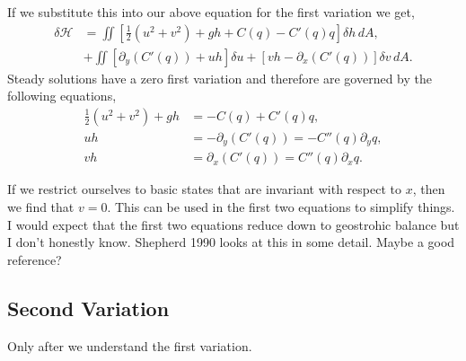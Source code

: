 \documentclass[12pt]{article}
\begin{document}
    If we substitute this into our above equation for the first variation we get,
    \begin{align*}
      \delta \mathcal{H} 
      & =  \iint \left[ \frac12  (u^2 + v^2) + g h  + C(q)  - C'(q) q\right] \delta h     \, dA, \\
      & +  \iint \left[ \partial_y ( C'(q) ) + u h \right] \delta u  +  \left[ vh - \partial_x ( C'(q) )  \right] \delta v \, dA.
    \end{align*}
    Steady solutions have a zero first variation and therefore are governed by the following equations,
    \begin{align*}
      \frac12  (u^2 + v^2) + g h & = - C(q)  + C'(q) q ,\\
       u h & = - \partial_y ( C'(q) ) = - C''(q) \partial_y q, \\
      vh  & = \partial_x ( C'(q) ) = C''(q) \partial_x q.
    \end{align*}

    If we restrict ourselves to basic states that are invariant with respect to $x$, then we find that $v= 0$.  This can be used in the first two equations to simplify things.  I would expect that the first two equations reduce down to geostrohic balance but I don't honestly know.  Shepherd 1990 looks at this in some detail.  Maybe a good reference?

  \subsection{Second Variation}
    Only after we understand the first variation.
\end{document}
